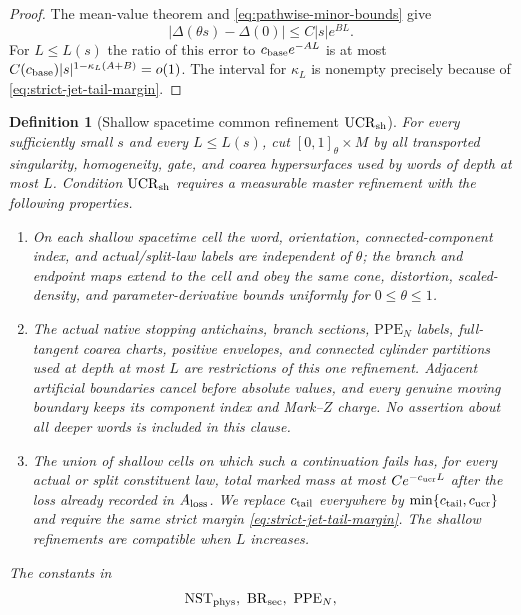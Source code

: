 \documentclass[11pt]{article}
\newtheorem{definition}[theorem]{Definition}
\begin{document}
\begin{proof}
The mean-value theorem and
\eqref{eq:pathwise-minor-bounds} give
\[
 |\Delta(\theta s)-\Delta(0)|\le C|s|e^{BL}.
\]
For $L\le L(s)$ the ratio of this error to
$c_{\rm base}e^{-AL}$ is at most
$C(c_{\rm base})|s|^{1-\kappa_L(A+B)}=o(1)$.  The interval for $\kappa_L$ is nonempty precisely
because of \eqref{eq:strict-jet-tail-margin}.
\end{proof}

\begin{definition}[Shallow spacetime common refinement
$\mathrm{UCR}_{\rm sh}$]
\label{def:spacetime-common-refinement}
For every sufficiently small $s$ and every $L\le L(s)$, cut
$[0,1]_\theta\times M$ by all transported singularity, homogeneity, gate,
and coarea hypersurfaces used by words of depth at most $L$.  Condition
$\mathrm{UCR}_{\rm sh}$ requires a measurable master refinement with the
following properties.
\begin{enumerate}[label=\textup{(UCR\arabic*)}]
\item On each shallow spacetime cell the word, orientation,
      connected-component index, and actual/split-law labels are independent
      of $\theta$; the branch and endpoint maps extend to the cell and obey
      the same cone, distortion, scaled-density, and parameter-derivative
      bounds uniformly for $0\le\theta\le1$.
\item The actual native stopping antichains, branch sections,
      $\mathrm{PPE}_{N}$ labels, full-tangent
      coarea charts, positive envelopes, and connected cylinder partitions
      used at depth at most $L$ are restrictions of this one refinement.
      Adjacent artificial boundaries cancel before absolute values, and every
      genuine moving boundary keeps its component index and Mark--$Z$ charge.
      No assertion about all deeper words is included in this clause.
\item The union of shallow cells on which such a continuation fails has, for
      every actual or split constituent law, total marked mass at most
      $Ce^{-c_{\rm ucr}L}$ after the loss already recorded in
      $A_{\rm loss}$.  We replace $c_{\rm tail}$ everywhere by
      $\min\{c_{\rm tail},c_{\rm ucr}\}$ and require the same strict margin
      \eqref{eq:strict-jet-tail-margin}.  The shallow refinements are
      compatible when $L$ increases.
\end{enumerate}
The constants in
\[
 \begin{gathered}
 \mathrm{NST}_{\rm phys},\ \mathrm{BR}_{\rm sec},\ \mathrm{PPE}_{N},\\

\end{gathered}\]
\end{definition}
\end{document}
